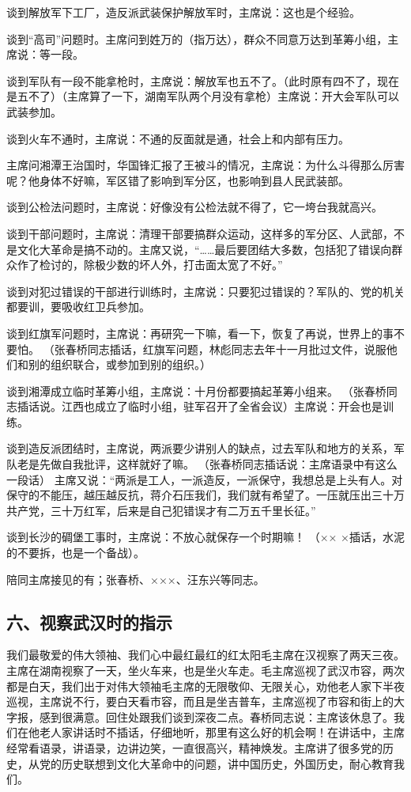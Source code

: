 {谈到解放军下工厂，造反派武装保护解放军时，主席说：这也是个经验。

谈到“高司”问题时。主席问到姓万的（指万达），群众不同意万达到革筹小组，主席说：等一段。

谈到军队有一段不能拿枪时，主席说：解放军也五不了。（此时原有四不了，现在是五不了）（主席算了一下，湖南军队两个月没有拿枪）主席说：开大会军队可以武装参加。

谈到火车不通时，主席说：不通的反面就是通，社会上和内部有压力。

主席问湘潭王治国时，华国锋汇报了王被斗的情况，主席说：为什么斗得那么厉害呢？他身体不好嘛，军区错了影响到军分区，也影响到县人民武装部。

谈到公检法问题时，主席说：好像没有公检法就不得了，它一垮台我就高兴。

谈到干部问题时，主席说：清理干部要搞群众运动，这样多的军分区、人武部，不是文化大革命是搞不动的。主席又说，“……最后要团结大多数，包括犯了错误向群众作了检讨的，除极少数的坏人外，打击面太宽了不好。”

谈到对犯过错误的干部进行训练时，主席说：只要犯过错误的？军队的、党的机关都要训，要吸收红卫兵参加。

谈到红旗军问题时，主席说：再研究一下嘛，看一下，恢复了再说，世界上的事不要怕。  （张春桥同志插话，红旗军问题，林彪同志去年十一月批过文件，说服他们和别的组织联合，或参加到别的组织。）

谈到湘潭成立临时革筹小组，主席说：十月份都要搞起革筹小组来。 （张春桥同志插话说。江西也成立了临时小组，驻军召开了全省会议）主席说：开会也是训练。

谈到造反派团结时，主席说，两派要少讲别人的缺点，过去军队和地方的关系，军队老是先做自我批评，这样就好了嘛。 （张春桥同志插话说：主席语录中有这么一段话） 主席又说：“两派是工人，一派造反，一派保守，我想总是上头有人。对保守的不能压，越压越反抗，蒋介石压我们，我们就有希望了。一压就压出三十万共产党，三十万红军，后来是自己犯错误才有二万五千里长征。”

谈到长沙的碉堡工事时，主席说：不放心就保存一个时期嘛！ （×× ×插话，水泥的不要拆，也是一个备战）。

陪同主席接见的有；张春桥、×××、汪东兴等同志。

\subsection{六、视察武汉时的指示}

我们最敬爱的伟大领袖、我们心中最红最红的红太阳毛主席在汉视察了两天三夜。主席在湖南视察了一天，坐火车来，也是坐火车走。毛主席巡视了武汉市容，两次都是白天，我们出于对伟大领袖毛主席的无限敬仰、无限关心，劝他老人家下半夜巡视，主席说不行，要白天看市容，而且是坐吉普车，主席巡视了市容和街上的大字报，感到很满意。回住处跟我们谈到深夜二点。春桥同志说：主席该休息了。我们在他老人家讲话时不插话，仔细地听，那里有这么好的机会啊！在讲话中，主席经常看语录，讲语录，边讲边笑，一直很高兴，精神焕发。主席讲了很多党的历史，从党的历史联想到文化大革命中的问题，讲中国历史，外国历史，耐心教育我们。

}
